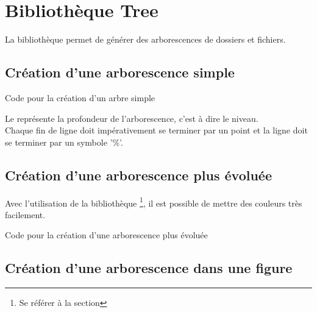 \chapter{Bibliothèque Tree}

La bibliothèque  permet de générer des arborescences de dossiers et fichiers.

\section{Création d'une arborescence simple}


\begin{Latex}{Code pour la création d'un arbre simple}
\end{Latex}


Le  représente la profondeur de l'arborescence, c'est à dire le niveau. \\
Chaque fin de ligne doit impérativement se terminer par un point et la ligne \bold{\\dirtree\{} doit se terminer par un symbole '\%'.


\section{Création  d'une arborescence plus évoluée}

Avec l'utilisation de la bibliothèque  \footnote{Se référer à la section }, il est possible de mettre des couleurs très facilement.\\



\begin{Latex}{Code pour la création d'une arborescence plus évoluée}
\end{Latex}


\section{Création  d'une arborescence dans une figure}

